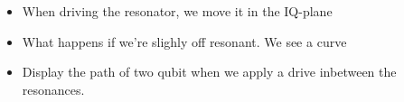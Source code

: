 \begin{itemize}
    \item When driving the resonator, we move it in the IQ-plane
    \item What happens if we're slighly off resonant. We see a curve
    \item Display the path of two qubit when we apply a drive inbetween the resonances. 
\end{itemize}


